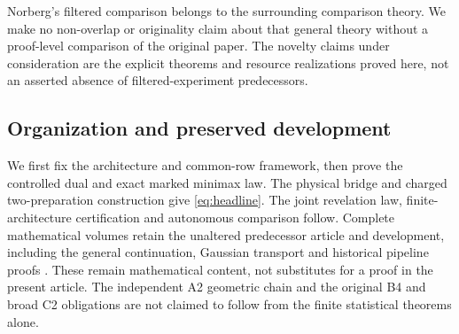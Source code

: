 Norberg's filtered comparison \cite{Norberg} belongs to the surrounding
comparison theory. We make no non-overlap or originality claim about
that general theory without a proof-level comparison of the original
paper. The novelty claims under consideration are the explicit theorems
and resource realizations proved here, not an asserted absence of
filtered-experiment predecessors.

\subsection{Organization and preserved development}
We first fix the architecture and common-row framework, then prove the
controlled dual and exact marked minimax law. The physical bridge and
charged two-preparation construction give \eqref{eq:headline}. The
joint revelation law, finite-architecture certification and autonomous
comparison follow. Complete mathematical volumes retain the unaltered
predecessor article and development, including the general continuation,
Gaussian transport and historical pipeline proofs \cite{Companion}.
These remain mathematical content, not substitutes for a proof in the
present article. The independent A2 geometric chain and the original
B4 and broad C2 obligations are not claimed to follow from the finite
statistical theorems alone.
